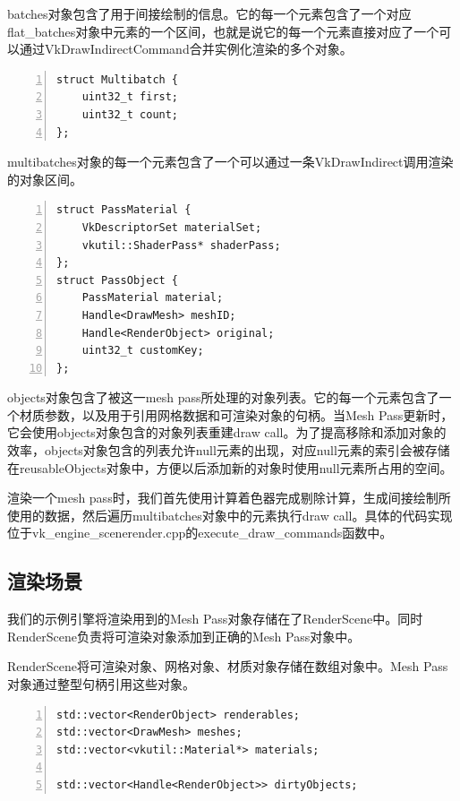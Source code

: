 \documentclass{ctexart}
\begin{document}
batches对象包含了用于间接绘制的信息。它的每一个元素包含了一个对应flat\_batches对象中元素的一个区间，也就是说它的每一个元素直接对应了一个可以通过VkDrawIndirectCommand合并实例化渲染的多个对象。

\begin{lstlisting}[language={[ANSI]C},keywordstyle=\color{blue!70},commentstyle=\color{red!50!green!50!blue!50},frame=shadowbox, rulesepcolor=\color{red!20!green!20!blue!20},basicstyle=\small,numbers=left, numberstyle=\tiny,breaklines=true]
struct Multibatch {
	uint32_t first;
	uint32_t count;
};
\end{lstlisting}

multibatches对象的每一个元素包含了一个可以通过一条VkDrawIndirect调用渲染的对象区间。

\begin{lstlisting}[language={[ANSI]C},keywordstyle=\color{blue!70},commentstyle=\color{red!50!green!50!blue!50},frame=shadowbox, rulesepcolor=\color{red!20!green!20!blue!20},basicstyle=\small,numbers=left, numberstyle=\tiny,breaklines=true]
struct PassMaterial {
	VkDescriptorSet materialSet;
	vkutil::ShaderPass* shaderPass;
};
struct PassObject {
	PassMaterial material;
	Handle<DrawMesh> meshID;
	Handle<RenderObject> original;
	uint32_t customKey;
};
\end{lstlisting}

objects对象包含了被这一mesh pass所处理的对象列表。它的每一个元素包含了一个材质参数，以及用于引用网格数据和可渲染对象的句柄。当Mesh Pass更新时，它会使用objects对象包含的对象列表重建draw call。为了提高移除和添加对象的效率，objects对象包含的列表允许null元素的出现，对应null元素的索引会被存储在reusableObjects对象中，方便以后添加新的对象时使用null元素所占用的空间。

渲染一个mesh pass时，我们首先使用计算着色器完成剔除计算，生成间接绘制所使用的数据，然后遍历multibatches对象中的元素执行draw call。具体的代码实现位于vk\_engine\_scenerender.cpp的execute\_draw\_commands函数中。

\subsection{渲染场景}

我们的示例引擎将渲染用到的Mesh Pass对象存储在了RenderScene中。同时RenderScene负责将可渲染对象添加到正确的Mesh Pass对象中。

RenderScene将可渲染对象、网格对象、材质对象存储在数组对象中。Mesh Pass对象通过整型句柄引用这些对象。

\begin{lstlisting}[language={[ANSI]C},keywordstyle=\color{blue!70},commentstyle=\color{red!50!green!50!blue!50},frame=shadowbox, rulesepcolor=\color{red!20!green!20!blue!20},basicstyle=\small,numbers=left, numberstyle=\tiny,breaklines=true]
std::vector<RenderObject> renderables;
std::vector<DrawMesh> meshes;
std::vector<vkutil::Material*> materials;

std::vector<Handle<RenderObject>> dirtyObjects;
\end{lstlisting}
\end{document}
